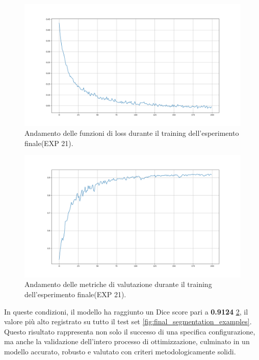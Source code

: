 \begin{minipage}{.48\textwidth}
    \begin{figure}[H] 
        \centering 
        \includegraphics[width=\textwidth]{figures/losses.png} 
        \caption{Andamento delle funzioni di loss durante il training dell’esperimento finale(EXP 21).}
        \label{fig:losses}
    \end{figure} 
\end{minipage}
\hfill
\begin{minipage}{.48\textwidth}
    \begin{figure}[H] 
        \centering 
        \includegraphics[width=\textwidth]{figures/metrics.png} 
        \caption{Andamento delle metriche di valutazione durante il training dell’esperimento finale(EXP 21).}
        \label{fig:metrics}
    \end{figure} 
\end{minipage}




In queste condizioni, il modello ha raggiunto un Dice score pari a \textbf{0.9124} \ref{fig:metrics}, il valore più alto registrato su tutto il test set \ref{fig:final_segmentation_examples}. Questo risultato rappresenta non solo il successo di una specifica configurazione, ma anche la validazione dell’intero processo di ottimizzazione, culminato in un modello accurato, robusto e valutato con criteri metodologicamente solidi.


